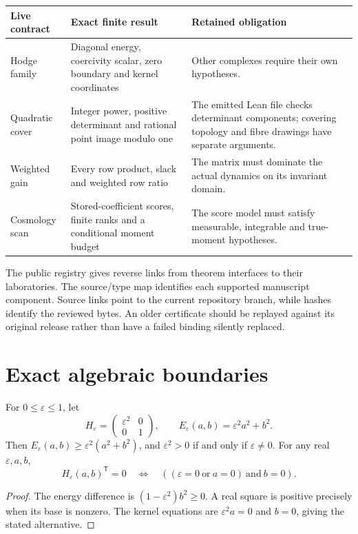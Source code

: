 \begin{longtable}{p{}p{}p{}}
\toprule
Live contract & Exact finite result & Retained obligation\\
\midrule
\endhead
Hodge family & Diagonal energy, coercivity scalar, zero boundary and kernel
coordinates & Other complexes require their own hypotheses.\\
Quadratic cover & Integer power, positive determinant and rational point image
modulo one & The emitted Lean file checks determinant components; covering
topology and fibre drawings have separate arguments.\\
Weighted gain & Every row product, slack and weighted row ratio & The matrix
must dominate the actual dynamics on its invariant domain.\\
Cosmology scan & Stored-coefficient scores, finite ranks and a conditional
moment budget & The score model must satisfy measurable, integrable and
true-moment hypotheses.\\
\bottomrule
\end{longtable}

The public registry gives reverse links from theorem interfaces to their
laboratories. The source/type map identifies each supported manuscript
component. Source links point to the current repository branch, while hashes
identify the reviewed bytes. An older certificate should be replayed against
its original release rather than have a failed binding silently replaced.

\section{Exact algebraic boundaries}

\begin{theorem}\label{thm:workbench-hodge-contract}
For \(0\leq\varepsilon\leq1\), let
\[
 H_\varepsilon=\begin{pmatrix}\varepsilon^2&0\\0&1\end{pmatrix},
 \qquad E_\varepsilon(a,b)=\varepsilon^2a^2+b^2.
\]
Then \(E_\varepsilon(a,b)\geq\varepsilon^2(a^2+b^2)\), and
\(\varepsilon^2>0\) if and only if \(\varepsilon\neq0\).
For any real \(\varepsilon,a,b\),
\[
 H_\varepsilon(a,b)^{\mathsf T}=0
 \quad\Longleftrightarrow\quad
 ((\varepsilon=0\ \text{or}\ a=0)\ \text{and}\ b=0).
\]
\end{theorem}
\begin{proof}
The energy difference is \((1-\varepsilon^2)b^2\geq0\). A real square
is positive precisely when its base is nonzero. The kernel equations are
\(\varepsilon^2a=0\) and \(b=0\), giving the stated alternative.
\end{proof}

